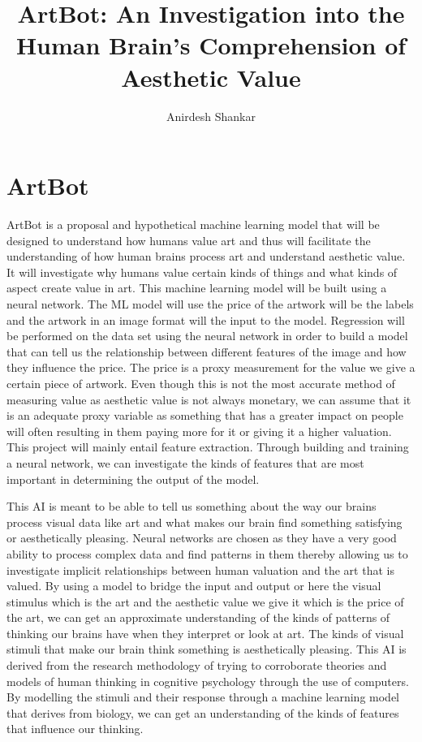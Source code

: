 \documentclass{article}
\title{ArtBot: An Investigation into the Human Brain's Comprehension of Aesthetic Value}
\author{Anirdesh Shankar}
\begin{document}
\maketitle

\section{ArtBot}

ArtBot is a proposal and hypothetical machine learning model that will be designed to understand how humans value art and thus will facilitate the understanding of how human brains process art and understand aesthetic value. It will investigate why humans value certain kinds of things and what kinds of aspect create value in art. This machine learning model will be built using a neural network. The ML model will use the price of the artwork will be the labels and the artwork in an image format will the input to the model. Regression will be performed on the data set using the neural network in order to build a model that can tell us the relationship between different features of the image and how they influence the price. The price is a proxy measurement for the value we give a certain piece of artwork. Even though this is not the most accurate method of measuring value as aesthetic value is not always monetary, we can assume that it is an adequate proxy variable as something that has a greater impact on people will often resulting in them paying more for it or giving it a higher valuation. This project will mainly entail feature extraction. Through building and training a neural network, we can investigate the kinds of features that are most important in determining the output of the model. \newline 

This AI is meant to be able to tell us something about the way our brains process visual data like art and what makes our brain find something satisfying or aesthetically pleasing. Neural networks are chosen as they have a very good ability to process complex data and find patterns in them thereby allowing us to investigate implicit relationships between human valuation and the art that is valued. By using a model to bridge the input and output or here the visual stimulus which is the art and the aesthetic value we give it which is the price of the art, we can get an approximate understanding of the kinds of patterns of thinking our brains have when they interpret or look at art. The kinds of visual stimuli that make our brain think something is aesthetically pleasing. This AI is derived from the research methodology of trying to corroborate theories and models of human thinking in cognitive psychology through the use of computers. By modelling the stimuli and their response through a machine learning model that derives from biology, we can get an understanding of the kinds of features that influence our thinking. \newline
\end{document}
